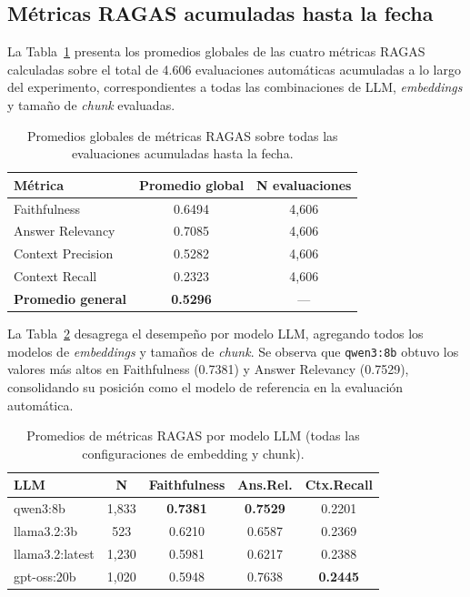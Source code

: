 \subsection{Métricas RAGAS acumuladas hasta la fecha}\label{sec:ragas_acumuladas}

La Tabla~\ref{tab:ragas-global} presenta los promedios globales de las cuatro métricas RAGAS calculadas sobre el total de 4.606 evaluaciones automáticas acumuladas a lo largo del experimento, correspondientes a todas las combinaciones de LLM, \textit{embeddings} y tamaño de \textit{chunk} evaluadas.

\begin{table}[H]
\centering
\begin{tabular}{|l|c|c|}
\hline
\textbf{Métrica} & \textbf{Promedio global} & \textbf{N evaluaciones} \\
\hline
Faithfulness        & 0.6494 & 4{,}606 \\
Answer Relevancy    & 0.7085 & 4{,}606 \\
Context Precision   & 0.5282 & 4{,}606 \\
Context Recall      & 0.2323 & 4{,}606 \\
\hline
\textbf{Promedio general} & \textbf{0.5296} & --- \\
\hline
\end{tabular}
\caption{Promedios globales de métricas RAGAS sobre todas las evaluaciones acumuladas hasta la fecha.}
\label{tab:ragas-global}
\end{table}

La Tabla~\ref{tab:ragas-por-llm} desagrega el desempeño por modelo LLM, agregando todos los modelos de \textit{embeddings} y tamaños de \textit{chunk}. Se observa que \texttt{qwen3:8b} obtuvo los valores más altos en Faithfulness (0.7381) y Answer Relevancy (0.7529), consolidando su posición como el modelo de referencia en la evaluación automática.

\begin{table}[H]
\centering
\begin{tabular}{|l|c|c|c|c|}
\hline
\textbf{LLM} & \textbf{N} & \textbf{Faithfulness} & \textbf{Ans.Rel.} & \textbf{Ctx.Recall} \\
\hline
qwen3:8b        & 1{,}833 & \textbf{0.7381} & \textbf{0.7529} & 0.2201 \\
llama3.2:3b     &   523   & 0.6210 & 0.6587 & 0.2369 \\
llama3.2:latest & 1{,}230 & 0.5981 & 0.6217 & 0.2388 \\
gpt-oss:20b     & 1{,}020 & 0.5948 & 0.7638 & \textbf{0.2445} \\
\hline
\end{tabular}
\caption{Promedios de métricas RAGAS por modelo LLM (todas las configuraciones de embedding y chunk).}
\label{tab:ragas-por-llm}
\end{table}

